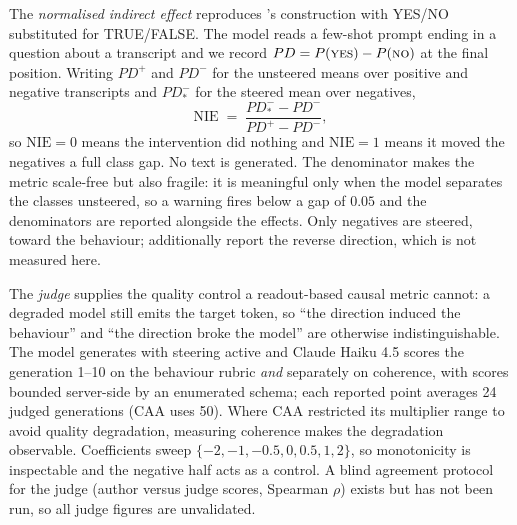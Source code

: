 \documentclass[conference]{IEEEtran}
\begin{document}
The \emph{normalised indirect effect} reproduces \citeauthor{marks2024}'s
construction with YES/NO substituted for TRUE/FALSE. The model reads a few-shot
prompt ending in a question about a transcript and we record
$PD = P(\textsc{yes})-P(\textsc{no})$ at the final position. Writing $PD^{+}$ and
$PD^{-}$ for the unsteered means over positive and negative transcripts and
$PD^{-}_{*}$ for the steered mean over negatives,
\begin{equation}
\mathrm{NIE} \;=\; \frac{PD^{-}_{*} - PD^{-}}{PD^{+} - PD^{-}} ,
\label{eq:nie}
\end{equation}
so $\mathrm{NIE}=0$ means the intervention did nothing and $\mathrm{NIE}=1$ means
it moved the negatives a full class gap. No text is generated. The denominator
makes the metric scale-free but also fragile: it is meaningful only when the model
separates the classes unsteered, so a warning fires below a gap of $0.05$ and the
denominators are reported alongside the effects. Only negatives are steered,
toward the behaviour; \citeauthor{marks2024} additionally report the reverse
direction, which is not measured here.

The \emph{judge} supplies the quality control a readout-based causal metric
cannot: a degraded model still emits the target token, so ``the direction
induced the behaviour'' and ``the direction broke the model'' are otherwise
indistinguishable. The model generates with steering active and Claude
Haiku 4.5 scores the generation 1--10 on the behaviour rubric \emph{and}
separately on coherence, with scores bounded server-side by an enumerated
schema; each reported point averages 24 judged generations (CAA uses 50).
Where CAA restricted its multiplier range to avoid quality degradation,
measuring coherence makes the degradation observable. Coefficients sweep
$\{-2,-1,-0.5,0,0.5,1,2\}$, so monotonicity is inspectable and the negative half
acts as a control. A blind agreement protocol for the judge (author versus judge
scores, Spearman $\rho$) exists but has not been run, so all judge figures are
unvalidated.
\end{document}
